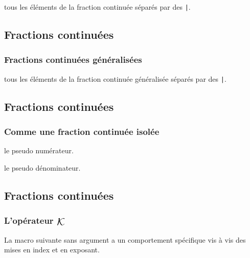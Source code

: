 \documentclass[12pt,a4paper]{book}
\theoremstyle{definition}
\begin{document}
{{

\IDarg{} tous les éléments de la fraction continuée séparés par des \verb+|+.




\subsection{Fractions continuées}

\subsubsection{Fractions continuées généralisées}





\IDarg{} tous les éléments de la fraction continuée généralisée séparés par des \verb+|+.




\subsection{Fractions continuées}

\subsubsection{Comme une fraction continuée isolée}




 le pseudo numérateur.

 le pseudo dénominateur.




\subsection{Fractions continuées}

\subsubsection{\texorpdfstring{L'opérateur $\contfracope$}%
                           {L'opérateur K}}



La macro suivante sans argument a un comportement spécifique vis à vis des mises en index et en exposant. 


}}
\end{document}
